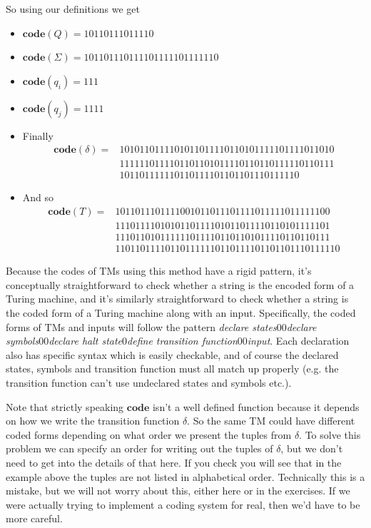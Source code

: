 \documentclass{article}
\theoremstyle{plain}
\theoremstyle{definition}
\newcommand{\co}{\mathbf{code}}
\begin{document}
So using our definitions we get 
\begin{itemize}
\item $\co(Q)=10110111011110$
\item $\co(\Sigma)=101101110111101111101111110$
\item $\co(q_i)=111$
\item $\co(q_j)=1111$
\item Finally \begin{align*}\co(\delta)=&1010110111101011011110110101111101111011010 \\
                                        &1111110111101101101011110110110111110110111 \\
																				&101101111110110111101101101110111110\end{align*}
\item And so \begin{align*} \co(T)=     &1011011101111001011011101111011111011111100 \\
                                        &1110111101010110111101011011110110101111101\\
																				&1110110101111110111101101101011110110110111\\
																				&110110111101101111110110111101101101110111110                                    																
                                       \end{align*}
\end{itemize}

Because the codes of TMs using this method have a rigid pattern, it's conceptually straightforward to check whether a string is the encoded form of a Turing machine, and it's similarly straightforward to check whether a string is the coded form of a Turing machine along with an input. Specifically, the coded forms of TMs and inputs will follow the pattern \emph{declare states}00\emph{declare symbols}00\emph{declare halt state}0\emph{define transition function}00\emph{input}. Each declaration also has specific syntax which is easily checkable, and of course the declared states, symbols and transition function must all match up properly (e.g. the transition function can't use undeclared states and symbols etc.).

Note that strictly speaking $\co$ isn't a well defined function because it depends on how we write the transition function $\delta$. So the same TM could have different coded forms depending on what order we present the tuples from $\delta$. To solve this problem we can specify an order for writing out the tuples of $\delta$, but we don't need to get into the details of that here. If you check you will see that in the example above the tuples are not listed in alphabetical order. Technically this is a mistake, but we will not worry about this, either here or in the exercises. If we were actually trying to implement a coding system for real, then we'd have to be more careful.  
\end{document}
